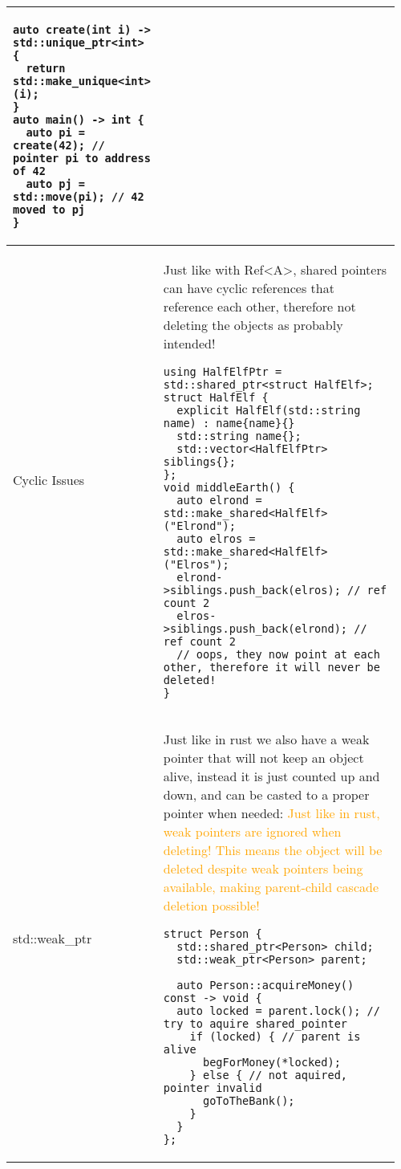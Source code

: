 \documentclass[main.tex,fontsize=8pt,paper=a4,paper=portrait,DIV=calc,]{scrartcl}
\begin{document}
\begin{table}[ht!]
\begin{tabular}{|m{0.2\linewidth}|m{0.755\linewidth}|}
\begin{lstlisting}
auto create(int i) -> std::unique_ptr<int> {
  return std::make_unique<int>(i);
}
auto main() -> int {
  auto pi = create(42); // pointer pi to address of 42
  auto pj = std::move(pi); // 42 moved to pj
}
\end{lstlisting}
\\
\hline
Cyclic Issues & 
Just like with Ref<A>, shared pointers can have cyclic references that reference each other, therefore not deleting the objects as probably intended!\newline
\begin{lstlisting}
using HalfElfPtr = std::shared_ptr<struct HalfElf>;
struct HalfElf {
  explicit HalfElf(std::string name) : name{name}{}
  std::string name{};
  std::vector<HalfElfPtr> siblings{};
};
void middleEarth() {
  auto elrond = std::make_shared<HalfElf>("Elrond");
  auto elros = std::make_shared<HalfElf>("Elros");
  elrond->siblings.push_back(elros); // ref count 2
  elros->siblings.push_back(elrond); // ref count 2 
  // oops, they now point at each other, therefore it will never be deleted!
}
\end{lstlisting}\\
\hline
std::weak\_ptr & 
Just like in rust we also have a weak pointer that will not keep an object alive, instead it is just counted up and down, and can be casted to a proper pointer when needed:\newline
\textcolor{orange}{Just like in rust, weak pointers are ignored when deleting! This means the object will be deleted despite weak pointers being available, making parent-child cascade deletion possible!}\newline
\begin{lstlisting}
struct Person {
  std::shared_ptr<Person> child;
  std::weak_ptr<Person> parent;

  auto Person::acquireMoney() const -> void {
  auto locked = parent.lock(); // try to aquire shared_pointer
    if (locked) { // parent is alive
      begForMoney(*locked);
    } else { // not aquired, pointer invalid
      goToTheBank();
    }
  }
};
\end{lstlisting} \\
\hline
\end{tabular}
\end{table}
\pagebreak
\end{document}
